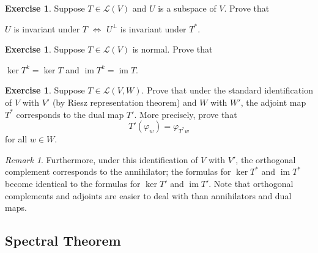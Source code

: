 \documentclass[nofonts,colorlinks]{tufte-handout}
\theoremstyle{plain} %
\newtheorem{thms}[thm]{Theorems}
\theoremstyle{definition}
\newtheorem{exer}[thm]{Exercise}
\theoremstyle{remark}
\newtheorem{rmk}[thm]{Remark}
\renewcommand{\phi}{\varphi}
\newcommand{\R}{\mathbf{R}}
\newcommand{\C}{\mathbf{C}}
\newcommand{\F}{\mathbf{F}}
\renewcommand{\L}{\mathcal{L}}
\DeclareMathOperator{\im}{im}
\begin{document}
\begin{exer}
	Suppose $T\in\L(V)$ and $U$ is a subspace of $V$. Prove that
	\begin{center}
		$U$ is invariant under $T$ $\iff$ $U^\perp$ is invariant under $T^*$.
	\end{center}
\end{exer}

\begin{exer}
	Suppose $T\in\L(V)$ is normal. Prove that
	\begin{center}
		$\ker T^k=\ker T$ \quad and \quad $\im T^k=\im T$.
	\end{center}
\end{exer}

\begin{exer}
	Suppose $T\in\L(V,W)$. Prove that under the standard identification of $V$ with $V'$ (by Riesz representation theorem) and $W$ with $W'$, the adjoint map $T^*$ corresponds to the dual map $T'$. More precisely, prove that
	\[T'(\phi_w)=\phi_{T^*w}\]
	for all $w\in W$.
\end{exer}

\begin{rmk}
	Furthermore, under this identification of $V$ with $V'$, the orthogonal complement corresponds to the annihilator; the formulas for $\ker T^*$ and $\im T^*$ become identical to the formulas for $\ker T'$ and $\im T'$. Note that orthogonal complements and adjoints are easier to deal with than annihilators and dual maps.
\end{rmk}


\subsection{Spectral Theorem}
\end{document}
